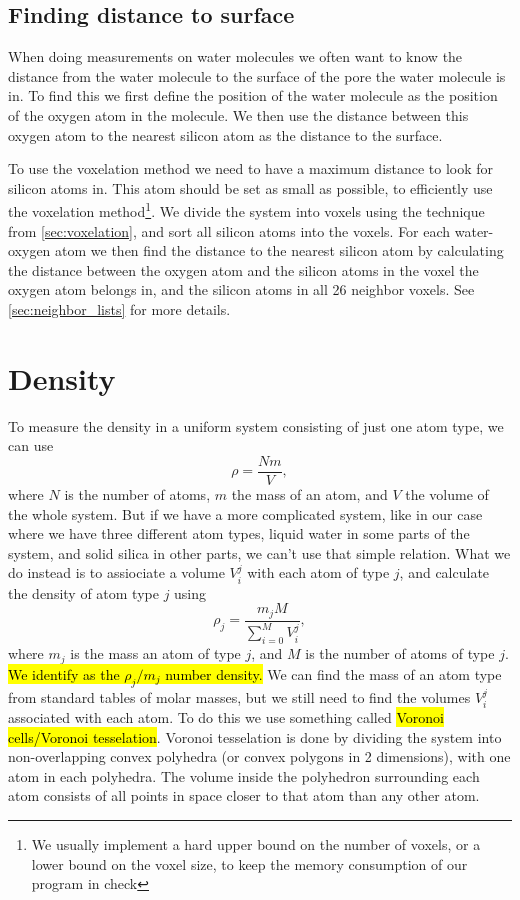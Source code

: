 \subsection{Finding distance to surface\label{sec:find_distance_to_surface}}
When doing measurements on water molecules we often want to know the distance from the water molecule to the surface of the pore the water molecule is in. To find this we first define the position of the water molecule as the position of the oxygen atom in the molecule. We then use the distance between this oxygen atom to the nearest silicon atom as the distance to the surface.

To use the voxelation method we need to have a maximum distance to look for silicon atoms in. This atom should be set as small as possible, to efficiently use the voxelation method\footnote{We usually implement a hard upper bound on the number of voxels, or a lower bound on the voxel size, to keep the memory consumption of our program in check}. We divide the system into voxels using the technique from \cref{sec:voxelation}, and sort all silicon atoms into the voxels. For each water-oxygen atom we then find the distance to the nearest silicon atom by calculating the distance between the oxygen atom and the silicon atoms in the voxel the oxygen atom belongs in, and the silicon atoms in all 26 neighbor voxels. See \cref{sec:neighbor_lists} for more details.

\FloatBarrier
\section{Density}
To measure the density in a uniform system consisting of just one atom type, we can use
\[
    \rho = \frac{Nm}{V},
\]
where $N$ is the number of atoms, $m$ the mass of an atom, and $V$ the volume of the whole system. But if we have a more complicated system, like in our case where we have three different atom types, liquid water in some parts of the system, and solid silica in other parts, we can't use that simple relation. What we do instead is to assiociate a volume $V_i^j$ with each atom of type $j$, and calculate the density of atom type $j$ using
\[
    \rho_j = \dfrac{m_jM}{\sum_{i=0}^M V_i^j},
\]
where $m_j$ is the mass an atom of type $j$, and $M$ is the number of atoms of type $j$. \hl{We identify as the $\rho_j/m_j$ number density.} We can find the mass of an atom type from standard tables of molar masses, but we still need to find the volumes $V_i^j$ associated with each atom. To do this we use something called \hl{Voronoi cells/Voronoi tesselation}. Voronoi tesselation is done by dividing the system into non-overlapping convex polyhedra (or convex polygons in 2 dimensions), with one atom in each polyhedra. The volume inside the polyhedron surrounding each atom consists of all points in space closer to that atom than any other atom. 

